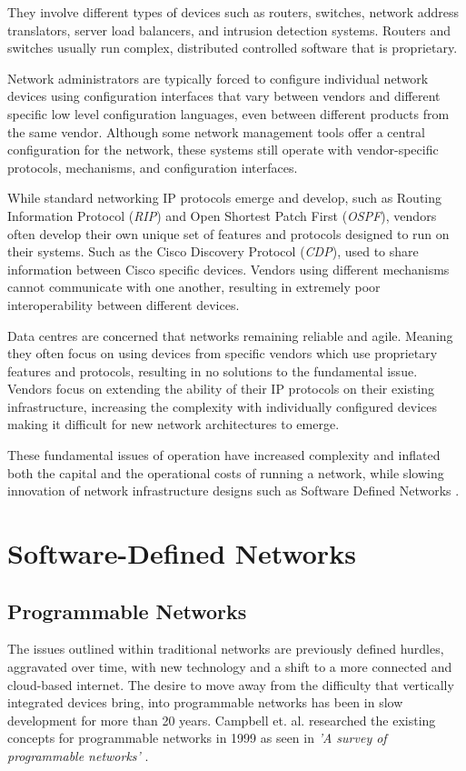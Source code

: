 \documentclass[12pt, oneside]{book}
\begin{document}
They involve different types of devices such as routers,
switches, network address translators, server load balancers, and intrusion
detection systems. Routers and switches usually run complex, distributed controlled software that is proprietary.

Network administrators are typically forced to configure individual network devices using configuration interfaces that
vary between vendors and different specific low level
configuration languages, even between different products from the same vendor. Although some network management tools
offer a central configuration for the network, these systems still operate with vendor-specific
protocols, mechanisms, and configuration interfaces.


While standard networking IP protocols emerge and develop, such as
Routing Information Protocol (\emph{RIP}) and Open Shortest Patch First (\emph{OSPF})\cite{rakheja2012performance}, vendors
often develop their own unique set of features and protocols designed to run on their systems.
Such as the Cisco Discovery Protocol (\emph{CDP})\cite{rodriguez2009topology}, used to share information between Cisco
specific devices. Vendors using different mechanisms cannot communicate with one another, resulting in extremely poor
interoperability between different devices.


Data centres are concerned that networks remaining reliable and
agile. Meaning they often focus on using devices from specific vendors which use proprietary
features and protocols, resulting in no solutions to the fundamental issue.
Vendors focus on extending the ability of their IP protocols on
their existing infrastructure, increasing the complexity with individually configured devices
making it difficult for new network architectures to emerge.

These fundamental issues of operation have increased
complexity and inflated both the capital and the operational costs of running a network, while
slowing innovation of network infrastructure designs such as Software Defined Networks
\cite{feamster2013road}\cite{benson2009unraveling}.


\section{Software-Defined Networks}
\label{sec:SDNBASED}
\subsection{Programmable Networks}
The issues outlined within traditional networks are previously defined hurdles, aggravated over time, with new technology
and a shift to a more connected and cloud-based internet. The desire to move away from the
difficulty that vertically integrated devices bring, into programmable networks has been in slow development for
more than 20 years. Campbell et. al. researched the existing concepts for programmable networks in 1999
 as seen in \emph{'A survey of programmable networks'} \cite{campbell1999survey}.
\end{document}
